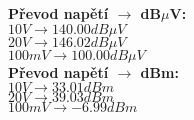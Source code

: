\documentclass[10pt, a4paper]{article}%
\begin{document}
	\begin{minipage}[t]{0.5\textwidth}
		\textbf { Převod napětí $\rightarrow$ dB$\mu $V:}\\
		$10V \rightarrow 140.00dB\mu V$ \\
		$20V \rightarrow 146.02dB\mu V$ \\
		$100mV \rightarrow 100.00dB\mu V$ \\
		
		\textbf {Převod napětí $\rightarrow$ dBm:}\\
		$10V \rightarrow 33.01dBm$ \\
		$20V \rightarrow 39.03dBm$ \\
		$100mV \rightarrow -6.99dBm$ \\
	\end{minipage}
\end{document}
